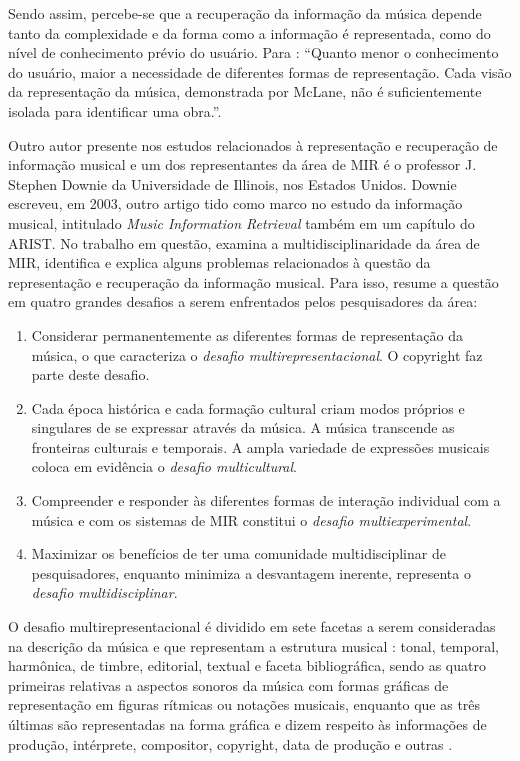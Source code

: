 Sendo assim, percebe-se que a recuperação da informação da música depende tanto da complexidade e da forma como a informação é representada, como do nível de conhecimento prévio do usuário. Para : “Quanto menor o conhecimento do usuário, maior a necessidade de diferentes formas de representação. Cada visão da representação da música, demonstrada por McLane, não é suficientemente isolada para identificar uma obra.”.

Outro autor presente nos estudos relacionados à representação e recuperação de informação musical e um dos representantes da área de MIR é o professor J. Stephen Downie da Universidade de Illinois, nos Estados Unidos. Downie escreveu, em 2003, outro artigo tido como marco no estudo da informação musical, intitulado \textit{Music Information Retrieval} também em um capítulo do ARIST. No trabalho em questão,  examina a multidisciplinaridade da área de MIR, identifica e explica alguns problemas relacionados à questão da representação e recuperação da informação musical. Para isso,  resume a questão em quatro grandes desafios a serem enfrentados pelos pesquisadores da área:

\begin{citacao}
    \begin{enumerate}
        \item Considerar permanentemente as diferentes formas de representação da música, o que caracteriza o \textit{desafio multirepresentacional}. O copyright faz parte deste desafio.
        \item Cada época histórica e cada formação cultural criam modos próprios e singulares de se expressar através da música. A música transcende as fronteiras culturais e temporais. A ampla variedade de expressões musicais coloca em evidência o \textit{desafio multicultural}.
        \item Compreender e responder às diferentes formas de interação individual com a música e com os sistemas de MIR constitui o \textit{desafio multiexperimental}.
        \item Maximizar os benefícios de ter uma comunidade multidisciplinar de pesquisadores, enquanto minimiza a desvantagem inerente, representa o \textit{desafio multidisciplinar}.
    \end{enumerate} 
\end{citacao}

O desafio multirepresentacional é dividido em sete facetas a serem consideradas na descrição da música e que representam a estrutura musical \cite{downie2003}: tonal, temporal, harmônica, de timbre, editorial, textual e faceta bibliográfica, sendo as quatro primeiras relativas a aspectos sonoros da música com formas gráficas de representação em figuras rítmicas ou notações musicais, enquanto que as três últimas são representadas na forma gráfica e dizem respeito às informações de produção, intérprete, compositor, copyright, data de produção e outras \cite{barros2012}.

